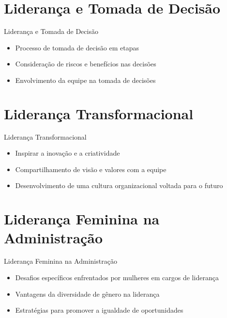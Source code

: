 \documentclass[aspectratio=169,xcolor=dvipsnames]{beamer}
\begin{document}
\section{Liderança e Tomada de Decisão}

\begin{frame}{Liderança e Tomada de Decisão}
	\begin{itemize}
		\item Processo de tomada de decisão em etapas
		\item Consideração de riscos e benefícios nas decisões
		\item Envolvimento da equipe na tomada de decisões

	\end{itemize}
\end{frame}

\section{Liderança Transformacional}

\begin{frame}{Liderança Transformacional}
	\begin{itemize}
		\item Inspirar a inovação e a criatividade
		\item Compartilhamento de visão e valores com a equipe
		\item Desenvolvimento de uma cultura organizacional voltada para o futuro

	\end{itemize}
\end{frame}

\section{Liderança Feminina na Administração}

\begin{frame}{Liderança Feminina na Administração}
	\begin{itemize}
		\item Desafios específicos enfrentados por mulheres em cargos de liderança
		\item Vantagens da diversidade de gênero na liderança
		\item Estratégias para promover a igualdade de oportunidades

	\end{itemize}
\end{frame}
\end{document}
